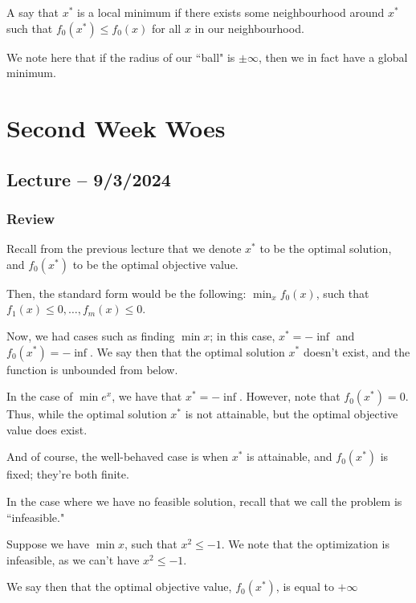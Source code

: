 \documentclass[openany]{book}
\begin{document}
\begin{defn}
	A say that $x^{*}$ is a local minimum if there exists some neighbourhood around $x^{*}$ such that $f_0(x^{*}) \leq f_0(x)$ for all $x$ in our neighbourhood.
	
	We note here that if the radius of our ``ball" is $\pm \infty$, then we in fact have a global minimum.
\end{defn}

\chapter{Second Week Woes}
\section{Lecture -- 9/3/2024}
\subsection{Review}
Recall from the previous lecture that we denote $x^{*}$ to be the optimal solution, and $f_0(x^{*})$ to be the optimal objective value.

Then, the standard form would be the following: $\min_x f_0(x)$, such that $f_1(x) \leq 0, \ldots, f_m(x) \leq 0$.

Now, we had cases such as finding $\min x$; in this case, $x^{*} = -\inf$ and $f_0(x^{*}) = -\inf$. We say then that the optimal solution $x^{*}$ doesn't exist, and the function is unbounded from below.

In the case of $\min e^{x}$, we have that $x^{*} = -\inf$. However, note that $f_0(x^{*}) = 0$. Thus, while the optimal solution $x^{*}$ is not attainable, but the optimal objective value does exist.

And of course, the well-behaved case is when $x^{*}$ is attainable, and $f_0(x^{*})$ is fixed; they're both finite.

In the case where we have no feasible solution, recall that we call the problem is ``infeasible."

\begin{example}
	Suppose we have $\min x$, such that $x^{2} \leq -1$. We note that the optimization is infeasible, as we can't have $x^{2} \leq -1$.
	
	We say then that the optimal objective value, $f_0(x^{*})$, is equal to $+\infty$
\end{example}
\end{document}
